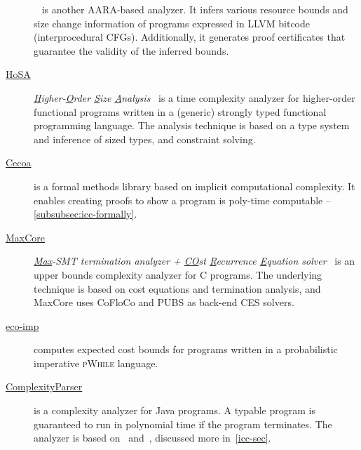 \begin{description}
\item[\href{https://github.com/academic-archive/cav17-pastis}{}]
      ~\cite{carbonneaux2017,carbonneaux2018}
      is another AARA-based analyzer. It infers various resource bounds and size
      change information of programs expressed in LLVM bitcode (interprocedural
      CFGs). Additionally, it generates proof certificates that guarantee the
      validity of the inferred bounds.

\item[\href{http://cl-informatik.uibk.ac.at/users/zini/software/hosa/}{HoSA}]
      \emph{\underline{H}igher-\underline{O}rder \underline{S}ize
      \underline{A}nalysis}~\cite{avanzini2017}
      is a time complexity analyzer for higher-order functional programs written
      in a (generic) strongly typed functional programming language. The
      analysis technique is based on a type system and inference of sized types,
      and constraint solving.

\item[\href{https://github.com/davidnowak/cecoa}
     {Cecoa}]\cite{feree2018}
     is a formal methods library based on implicit computational complexity.
     It enables creating proofs to show a program is poly-time
     computable -- \autoref{subsubsec:icc-formally}.

\item[\href{https://costa.fdi.ucm.es/maxcore/}{MaxCore}]%
      \emph{\underline{Max}-SMT termination analyzer + \underline{CO}st
      \underline{R}ecurrence \underline{E}quation
      solver}~\cite{albert2019} is an upper bounds complexity
      analyzer for C programs. The underlying technique is based on
      cost equations and termination analysis, and MaxCore uses CoFloCo and PUBS
      as back-end CES solvers.

\item[\href{https://www-sop.inria.fr/members/Martin.Avanzini/software/eco-imp/}
      {eco-imp}]\cite{avanzini2020}
      computes expected cost bounds for programs written in a probabilistic
      imperative \textsc{pWhile} language.

\item[\href{https://gitlab.inria.fr/complexityparser/complexityparser}
      {ComplexityParser}]\cite{hainry2021}
      is a complexity analyzer for Java programs. A typable program
      is guaranteed to run in polynomial time if the program terminates. The
      analyzer is based on~\cite{hainry2015} and~\cite{hainry2018}, discussed
      more in~\autoref{icc-sec}.


\end{description}
